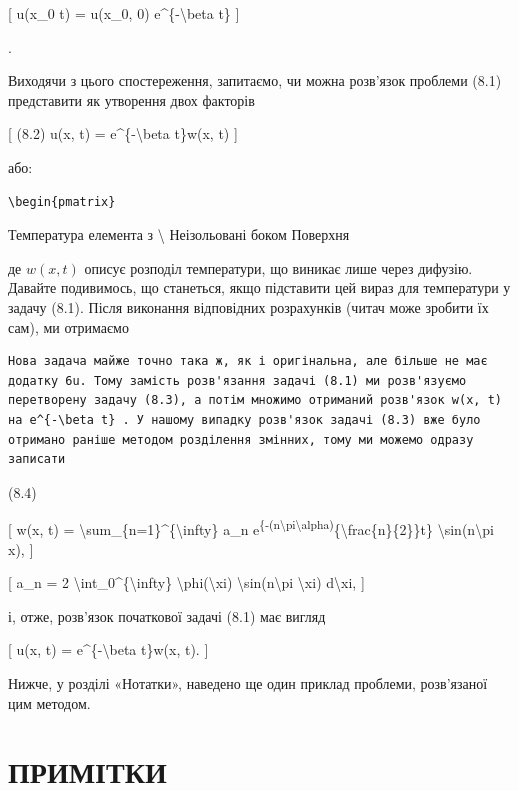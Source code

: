 \documentclass[
]{article}
\begin{document}
{[} u(x\_0 t) = u(x\_0, 0) e\^{}\{-\textbackslash beta t\} {]}

.

Виходячи з цього спостереження, запитаємо, чи можна розв'язок проблеми
(8.1) представити як утворення двох факторів

{[} (8.2) u(x, t) = e\^{}\{-\textbackslash beta t\}w(x, t) {]}

або:

\begin{verbatim}
\begin{pmatrix}
\end{verbatim}

Температура елемента з \textbackslash{} Неізольовані боком Поверхня

де \(w(x, t)\) описує розподіл температури, що виникає лише через
дифузію. Давайте подивимось, що станеться, якщо підставити цей вираз для
температури у задачу (8.1). Після виконання відповідних розрахунків
(читач може зробити їх сам), ми отримаємо

\begin{verbatim}
Нова задача майже точно така ж, як і оригінальна, але більше не має додатку 6u. Тому замість розв'язання задачі (8.1) ми розв'язуємо перетворену задачу (8.3), а потім множимо отриманий розв'язок w(x, t) на e^{-\beta t} . У нашому випадку розв'язок задачі (8.3) вже було отримано раніше методом розділення змінних, тому ми можемо одразу записати
\end{verbatim}

(8.4)

{[} w(x, t) = \textbackslash sum\_\{n=1\}\^{}\{\textbackslash infty\}
a\_n
e\textsuperscript{\{-(n\textbackslash pi\textbackslash alpha)}\{\textbackslash frac\{n\}\{2\}\}t\}
\textbackslash sin(n\textbackslash pi x), {]}

{[} a\_n = 2 \textbackslash int\_0\^{}\{\textbackslash infty\}
\textbackslash phi(\textbackslash xi)
\textbackslash sin(n\textbackslash pi \textbackslash xi)
d\textbackslash xi, {]}

і, отже, розв'язок початкової задачі (8.1) має вигляд

{[} u(x, t) = e\^{}\{-\textbackslash beta t\}w(x, t). {]}

Нижче, у розділі «Нотатки», наведено ще один приклад проблеми,
розв'язаної цим методом.

\section{ПРИМІТКИ}\label{ux43fux440ux438ux43cux456ux442ux43aux438-1}
\end{document}
